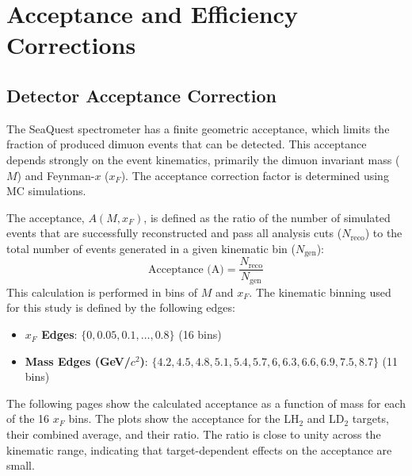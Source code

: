 \documentclass[11pt]{article}
\begin{document}
\section{Acceptance and Efficiency Corrections}
\label{sec:corrections}

\subsection{Detector Acceptance Correction}
The SeaQuest spectrometer has a finite geometric acceptance, which limits the fraction of produced dimuon events that can be detected. This acceptance depends strongly on the event kinematics, primarily the dimuon invariant mass ($M$) and Feynman-$x$ ($x_F$). The acceptance correction factor is determined using MC simulations.

The acceptance, $A(M, x_F)$, is defined as the ratio of the number of simulated events that are successfully reconstructed and pass all analysis cuts ($N_{\text{reco}}$) to the total number of events generated in a given kinematic bin ($N_{\text{gen}}$):
\begin{equation}
\text{Acceptance (A)} = \frac{N_{\text{reco}}}{N_{\text{gen}}}
\label{eq:acceptance}
\end{equation}
This calculation is performed in bins of $M$ and $x_F$. The kinematic binning used for this study is defined by the following edges:
\begin{itemize}
    \item \textbf{$x_F$ Edges}: $\{0, 0.05, 0.1, \dots, 0.8\}$ (16 bins)
    \item \textbf{Mass Edges (GeV/$c^2$)}: $\{4.2, 4.5, 4.8, 5.1, 5.4, 5.7, 6, 6.3, 6.6, 6.9, 7.5, 8.7\}$ (11 bins)
\end{itemize}

The following pages show the calculated acceptance as a function of mass for each of the 16 $x_F$ bins. The plots show the acceptance for the LH$_2$ and LD$_2$ targets, their combined average, and their ratio. The ratio is close to unity across the kinematic range, indicating that target-dependent effects on the acceptance are small.
\end{document}
